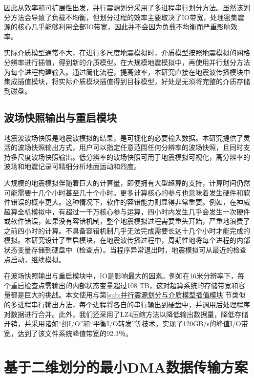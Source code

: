 \documentclass[degree=doctor]{thuthesis}
\begin{document}
因此从效率和可扩展性出发，并行震源划分采用了多进程串行划分方法。虽然该划分方法会导致了负载不均衡，但划分过程的效率主要取决了IO带宽，处理密集震源的核心几乎能够利用全部IO带宽，因此并不会因为负载不均衡而严重影响效率。

实际介质模型通常不大，在进行多尺度地震模拟时，介质模型按照地震模拟的网格分辨率进行插值，得到新的介质模型。在大规模地震模拟中，再使用并行划分方法为每个进程构建输入。通过简化流程，提高效率，本研究直接在地震波传播模块中集成插值模块，将实际介质模块插值得到目标模型，好处是无须将完整的介质存储到磁盘。

\subsection{波场快照输出与重启模块}
地震波波场快照是地震波模拟的结果，是可视化的必要输入数据。本研究提供了灵活的波场快照输出方式，用户可以指定任意范围任何分辨率的波场快照，且同时支持多尺度波场快照输出。低分辨率的波场快照可用于地震模拟可视化，高分辨率的波场和地震记录可精细分析地面运动和烈度。

大规模的地震模拟伴随着巨大的计算量，即便拥有大型超算的支持，计算时间仍然可能需要十几个小时甚至几十个小时。更多计算核心的参与也意味着发生硬件和软件错误的概率更大。这种情况下，软件的容错能力则显得非常重要。例如，在神威超算全机模拟中，有超过一千万核心参与运算，四小时内发生几乎会发生一次硬件或软件错误，如果没有容错机制，整个地震模拟过程需要重头开始，严重地浪费了之前四小时的计算。不具备容错机制几乎无法完成需要长达十几个小时才能完成的模拟。本研究设计了重启模块，在地震波传播过程中，周期性地将每个进程的内部状态变量存储到硬盘中（检查点）。当程序异常退出时，地震模拟可从最近的检查点启动，继续模拟。

在波场快照输出与重启模块中，IO是影响最大的因素。例如在16米分辨率下，每个重启检查点需输出的内部状态变量超过108 TB，这对超算系统的存储带宽和容量都是巨大的挑战。本文使用与第\ref{sub:并行震源划分与介质模型插值模块}节类似的多进程串行输出方法，每个进程将各自的串行输出到硬盘中，并调用后处理程序对数据进行合并。此外，我们还采用了LZ4压缩方法以降低输出数据量，降低存储开销，并采用诸如“组I/O”和“平衡I/O转发”等技术，实现了120GB/s的峰值I/O带宽，达到了该文件系统峰值带宽的92.3％。



\section{基于二维划分的最小DMA数据传输方案} %
\label{sec:基于二维划分的最小DMA数据传输方案}
\end{document}
